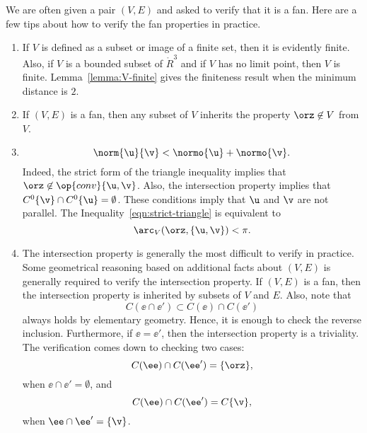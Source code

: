 \begin{remark}\label{remark:fan-verify}  
We are often given a pair $(V,E)$ and asked to verify
that it is a fan.  Here are a few tips about how to verify the fan
properties in practice.
\begin{enumerate} 
\item {} If $V$ is defined as a subset or image of a
finite set, then it is evidently finite.  Also, if $V$ is a bounded
subset of $\ring{R}^3$ and if $V$ has no limit point,  then $V$ is finite.
Lemma~\ref{lemma:V-finite} gives the finiteness result when the
minimum distance is $2$.\vspace{6pt}
\item {} If $(V,E)$ is a fan, then any subset of $V$
inherits the property $\orz\not\in V$ from $V$.  \vspace{6pt}
\item {} 
\begin{equation}\label{eqn:strict-triangle}
\norm{\u}{\v} < \normo{\u} + \normo{\v}.
\end{equation}
Indeed, the strict form of the triangle inequality implies that
$\orz\not\in \op{conv}\{\u,\v\}$.  Also, the intersection property
implies that $C^0\{\v\} \cap C^0\{\u\} = \emptyset$.  These conditions
imply that $\u$ and $\v$ are not parallel.  The Inequality~\eqref{eqn:strict-triangle}
is equivalent to
\[ 
\arc_V(\orz,\{\u,\v\}) < \pi.
\] 
\item {} The intersection property is generally the
most difficult to verify in practice.  Some geometrical reasoning
based on additional facts about $(V,E)$ is generally required to
verify the intersection property.  If $(V,E)$ is a fan, then the
intersection property is inherited by subsets of $V$ and $E$.  Also,
note that
\[ 
C(\ee\cap \ee') \subset C(\ee) \cap C(\ee')
\] 
always holds by elementary geometry.  Hence, it is enough to check the
reverse inclusion.  Furthermore, if $\ee = \ee'$, then the
intersection property is a triviality.  The verification comes down to
checking two cases:
\[ 
C(\ee) \cap C(\ee') = \{\orz\},
\] 
when $\ee\cap \ee' = \emptyset$, and
\[ 
C(\ee)\cap C(\ee') = C\{\v\},
\] 
when $\ee\cap \ee' = \{\v\}$.
\end{enumerate}
\end{remark}

